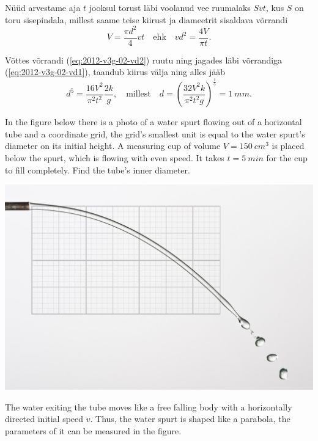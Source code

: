 Nüüd arvestame aja $t$ jooksul torust läbi voolanud vee ruumalaks $Svt$, kus $S$ on toru sisepindala, millest saame teise kiirust ja diameetrit sisaldava võrrandi
\begin{equation}\label{eq:2012-v3g-02-vd2}
V=\frac{\pi d^2}{4}vt \quad \mathrm{ehk} \quad vd^2=\frac{4V}{\pi t}.
\end{equation}

Võttes võrrandi (\ref{eq:2012-v3g-02-vd2}) ruutu ning jagades läbi võrrandiga (\ref{eq:2012-v3g-02-vd1}), taandub kiirus välja ning alles jääb
\[d^5=\frac{16V^2}{\pi^2t^2}\frac{2k}{g}, \quad \mathrm{millest} \quad d=\left(\frac{32V^2k}{\pi^2 t^2 g}\right)^{\frac{1}{5}}=\SI{1}{mm	}.\]

In the figure below there is a photo of a water spurt flowing out of a horizontal tube and a coordinate grid, the grid’s smallest unit is equal to the water spurt’s diameter on its initial height. A measuring cup of volume $V=\SI{150}{cm^3}$ is placed below the spurt, which is flowing with even speed.  It takes $t=\SI{5}{min}$ for the cup to fill completely. Find the tube’s inner diameter.
\begin{center}
\includegraphics[width=0.7\linewidth]{2012-v3g-02-jet}%
\end{center}

\hinteng
The water exiting the tube moves like a free falling body with a horizontally directed initial speed $v$. Thus, the water spurt is shaped like a parabola, the parameters of it can be measured in the figure.

